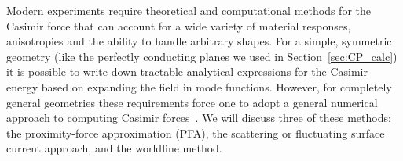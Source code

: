 Modern experiments require theoretical and computational methods
for the Casimir force that can account for a wide variety of material responses, anisotropies
and the ability to handle arbitrary shapes.  
For a simple, symmetric geometry (like the perfectly conducting planes we used in Section~\ref{sec:CP_calc})
it is possible to write down tractable analytical expressions for
the Casimir energy based on expanding the field in mode functions.
However, for completely general geometries these requirements force one to adopt a general 
numerical approach to computing Casimir forces~\citep{Johnson2011}.
We will discuss three of these methods: the proximity-force approximation (PFA), the scattering
or fluctuating surface current approach, and the worldline method.





